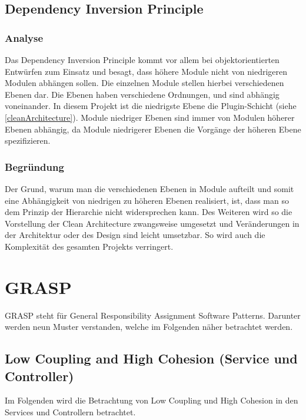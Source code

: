 \subsection{Dependency Inversion Principle}

        \subsubsection{Analyse}
        Das Dependency Inversion Principle kommt vor allem bei objektorientierten Entwürfen zum Einsatz und besagt, dass höhere Module nicht von niedrigeren Modulen abhängen sollen. Die einzelnen Module stellen hierbei verschiedenen Ebenen dar. Die Ebenen haben verschiedene Ordnungen, und sind abhängig voneinander. In diesem Projekt ist die niedrigste Ebene die Plugin-Schicht (siehe \cref{cleanArchitecture}). Module niedriger Ebenen sind immer von Modulen höherer Ebenen abhängig, da Module niedrigerer Ebenen die Vorgänge der höheren Ebene spezifizieren.
        
        \subsubsection{Begründung}
        Der Grund, warum man die verschiedenen Ebenen in Module aufteilt und somit eine Abhängigkeit von niedrigen zu höheren Ebenen realisiert, ist, dass man so dem Prinzip der Hierarchie nicht widersprechen kann. Des Weiteren wird so die Vorstellung der Clean Architecture zwangsweise umgesetzt und Veränderungen in der Architektur oder des Design sind leicht umsetzbar. So wird auch die Komplexität des gesamten Projekts verringert.

\section{GRASP}
GRASP steht für General Responsibility Assignment Software Patterns. Darunter werden neun Muster verstanden, welche im Folgenden näher betrachtet werden.

	\subsection{Low Coupling and High Cohesion (Service und Controller)}
	Im Folgenden wird die Betrachtung von Low Coupling und High Cohesion in den Services und Controllern betrachtet.
